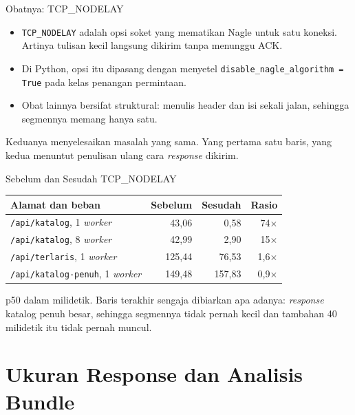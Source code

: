 \documentclass[aspectratio=169, table, 12pt]{beamer}
\begin{document}
\begin{frame}{{\Large Obatnya: TCP\_NODELAY}}
  \vspace{10pt}
  \begin{itemize}
    \item \texttt{TCP\_NODELAY} adalah opsi soket yang mematikan Nagle untuk
          satu koneksi. Artinya tulisan kecil langsung dikirim tanpa menunggu
          ACK.
    \item Di Python, opsi itu dipasang dengan menyetel
          \texttt{disable\_nagle\_algorithm = True} pada kelas penangan
          permintaan.
    \item Obat lainnya bersifat struktural: menulis header dan isi sekali
          jalan, sehingga segmennya memang hanya satu.
  \end{itemize}
  \vspace{8pt}
  {\small Keduanya menyelesaikan masalah yang sama. Yang pertama satu baris,
  yang kedua menuntut penulisan ulang cara \textit{response} dikirim.}
\end{frame}

\begin{frame}{{\Large Sebelum dan Sesudah TCP\_NODELAY}}
  \vspace{6pt}
  \centering
  {\footnotesize
  \begin{tabularx}{\textwidth}{Yrrr}
    \hline
    \textbf{Alamat dan beban} & \textbf{Sebelum} & \textbf{Sesudah} & \textbf{Rasio} \\
    \hline
    \texttt{/api/katalog}, 1 \textit{worker} & 43,06 & 0,58 & 74$\times$ \\
    \hline
    \texttt{/api/katalog}, 8 \textit{worker} & 42,99 & 2,90 & 15$\times$ \\
    \hline
    \texttt{/api/terlaris}, 1 \textit{worker} & 125,44 & 76,53 & 1,6$\times$ \\
    \hline
    \texttt{/api/katalog-penuh}, 1 \textit{worker} & 149,48 & 157,83 & 0,9$\times$ \\
    \hline
  \end{tabularx}}

  \vspace{8pt}
  {\footnotesize p50 dalam milidetik. Baris terakhir sengaja dibiarkan apa
  adanya: \textit{response} katalog penuh besar, sehingga segmennya tidak pernah kecil
  dan tambahan 40 milidetik itu tidak pernah muncul.}
\end{frame}

\section{Ukuran Response dan Analisis Bundle}
\end{document}
